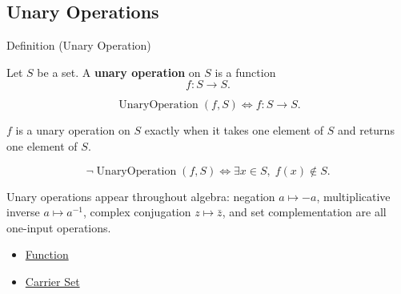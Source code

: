 \subsection*{Unary Operations}
\label{subsec:unary-operations}

\begin{definitionbox}{Definition (Unary Operation)}
\begin{definition}
\label{def:unary-operation}
Let $S$ be a set.
A \textbf{unary operation} on $S$ is a function
\[
f:S \to S.
\]
\end{definition}
\end{definitionbox}

\begin{remark*}
\[
\operatorname{UnaryOperation}(f,S)
\Longleftrightarrow
f:S\to S.
\]
\end{remark*}

\begin{remark*}
$f$ is a unary operation on $S$ exactly when it takes one element of $S$ and
returns one element of $S$.
\end{remark*}

\begin{remark*}
\[
\neg\operatorname{UnaryOperation}(f,S)
\Longleftrightarrow
\exists x\in S,\; f(x)\notin S.
\]
\end{remark*}

\begin{remark*}[Interpretation]
Unary operations appear throughout algebra: negation $a \mapsto -a$,
multiplicative inverse $a \mapsto a^{-1}$, complex conjugation
$z \mapsto \bar z$, and set complementation are all one-input operations.
\end{remark*}

\begin{dependencies}
\begin{itemize}
  \item \hyperref[def:alg-function]{Function}
  \item \hyperref[def:carrier-set]{Carrier Set}
\end{itemize}
\end{dependencies}
